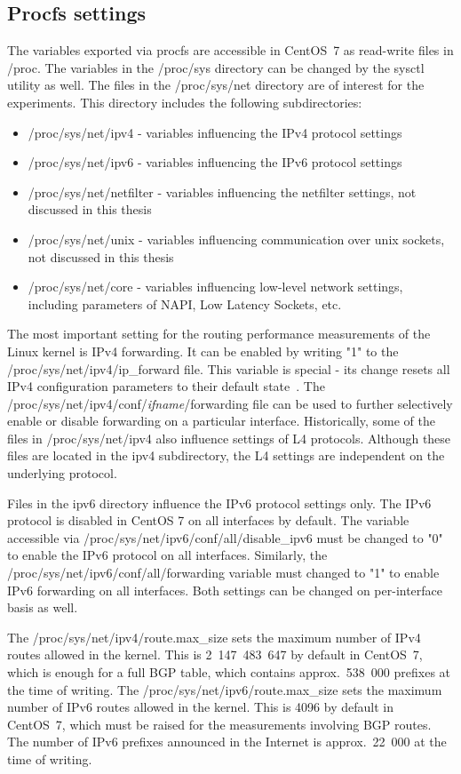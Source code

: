 \subsection{Procfs settings}
The variables exported via procfs are accessible in CentOS~7 as read-write files in /proc.
The variables in the /proc/sys directory can be changed by the sysctl utility as well.
The files in the /proc/sys/net directory are of interest for the experiments.
This directory includes the following subdirectories:
\begin{itemize}
\item /proc/sys/net/ipv4 - variables influencing the IPv4 protocol settings
\item /proc/sys/net/ipv6 - variables influencing the IPv6 protocol settings
\item /proc/sys/net/netfilter - variables influencing the netfilter settings, not discussed in this thesis
\item /proc/sys/net/unix - variables influencing communication over unix sockets, not discussed in this thesis
\item /proc/sys/net/core - variables influencing low-level network settings, including parameters of NAPI, Low Latency Sockets, etc.
\end{itemize}

The most important setting for the routing performance measurements of the Linux kernel is IPv4 forwarding.
It can be enabled by writing "1" to the /proc/sys/net/ipv4/ip\_forward file.
This variable is special - its change resets all IPv4 configuration parameters to their default state~\cite{kernel-doc-ip-sysctl}.
The /proc/sys/net/ipv4/conf/{\it{ifname}}/forwarding file can be used
to further selectively enable or disable forwarding on a particular interface.
Historically, some of the files in /proc/sys/net/ipv4 also influence settings of L4 protocols.
Although these files are located in the ipv4 subdirectory, the L4 settings are independent on the underlying protocol.

Files in the ipv6 directory influence the IPv6 protocol settings only.
The IPv6 protocol is disabled in CentOS 7 on all interfaces by default.
The variable accessible via /proc/sys/net/ipv6/conf/all/disable\_ipv6 must be changed to "0" to
enable the IPv6 protocol on all interfaces.
Similarly, the /proc/sys/net/ipv6/conf/all/forwarding variable must changed to "1" to enable IPv6 forwarding on all interfaces.
Both settings can be changed on per-interface basis as well.

The /proc/sys/net/ipv4/route.max\_size sets the maximum number of IPv4 routes allowed in the kernel.
This is 2~147~483~647 by default in CentOS~7, which is enough for a full BGP table,
which contains approx.~538~000 prefixes at the time of writing. %
The /proc/sys/net/ipv6/route.max\_size sets the maximum number of IPv6 routes allowed in the kernel.
This is 4096 by default in CentOS~7, which must be raised for the measurements involving BGP routes.
The number of IPv6 prefixes announced in the Internet is approx.~22~000 at the time of writing. %

